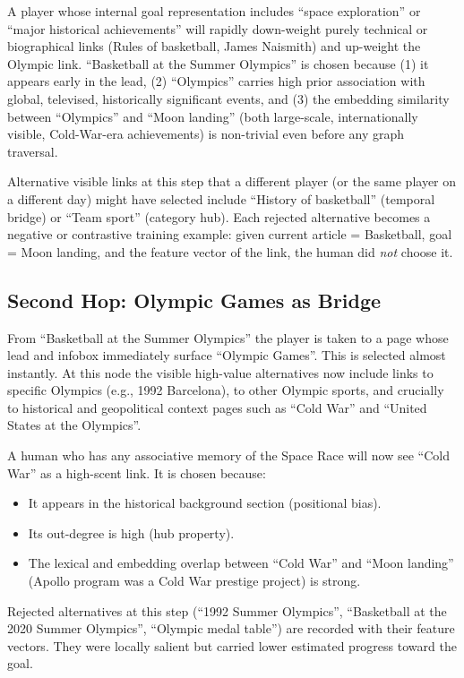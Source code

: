 \documentclass[11pt,a4paper]{report}
\begin{document}
A player whose internal goal representation includes ``space exploration'' or ``major historical achievements'' will rapidly down-weight purely technical or biographical links (Rules of basketball, James Naismith) and up-weight the Olympic link. ``Basketball at the Summer Olympics'' is chosen because (1) it appears early in the lead, (2) ``Olympics'' carries high prior association with global, televised, historically significant events, and (3) the embedding similarity between ``Olympics'' and ``Moon landing'' (both large-scale, internationally visible, Cold-War-era achievements) is non-trivial even before any graph traversal.

Alternative visible links at this step that a different player (or the same player on a different day) might have selected include ``History of basketball'' (temporal bridge) or ``Team sport'' (category hub). Each rejected alternative becomes a negative or contrastive training example: given current article = Basketball, goal = Moon landing, and the feature vector of the link, the human did \textit{not} choose it.

\subsection{Second Hop: Olympic Games as Bridge}

From ``Basketball at the Summer Olympics'' the player is taken to a page whose lead and infobox immediately surface ``Olympic Games''. This is selected almost instantly. At this node the visible high-value alternatives now include links to specific Olympics (e.g., 1992 Barcelona), to other Olympic sports, and crucially to historical and geopolitical context pages such as ``Cold War'' and ``United States at the Olympics''.

A human who has any associative memory of the Space Race will now see ``Cold War'' as a high-scent link. It is chosen because:
\begin{itemize}
    \item It appears in the historical background section (positional bias).
    \item Its out-degree is high (hub property).
    \item The lexical and embedding overlap between ``Cold War'' and ``Moon landing'' (Apollo program was a Cold War prestige project) is strong.
\end{itemize}

Rejected alternatives at this step (``1992 Summer Olympics'', ``Basketball at the 2020 Summer Olympics'', ``Olympic medal table'') are recorded with their feature vectors. They were locally salient but carried lower estimated progress toward the goal.
\end{document}
